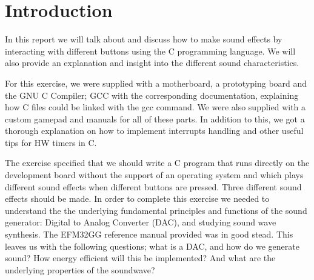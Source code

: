 

\chapter{Introduction}

In this report we will talk about and discuss how to make sound effects by interacting with different buttons using the C programming language. We will also provide an explanation and insight into the different sound characteristics.

For this exercise, we were supplied with a motherboard, a prototyping board and the GNU C Compiler; GCC with the corresponding documentation, explaining how C files could be linked with the gcc command.  We were also supplied with a custom gamepad and manuals for all of these parts. In addition to this, we got a thorough explanation on how to implement interrupts handling and other useful tips for HW timers in C. 

The exercise specified that we should write a C program that runs directly on the development board without the support of an operating system and which plays different sound effects when different buttons are pressed. Three different sound effects should be made. In order to complete this exercise we needed to understand the the underlying fundamental principles and functions of the sound generator: Digital to Analog Converter (DAC), and studying sound wave synthesis. The EFM32GG reference manual provided was in good stead. 
This leaves us with the following questions; what is a DAC, and how do we generate sound? How energy efficient will this be implemented? And what are the underlying properties of the soundwave?



